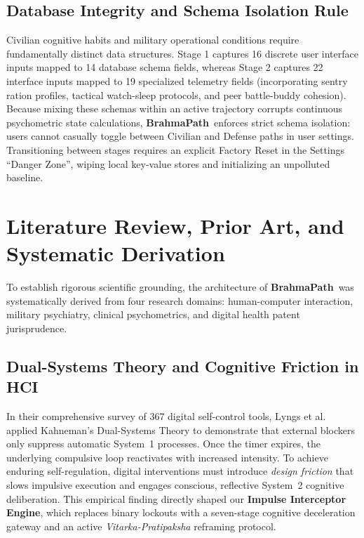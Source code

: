 \documentclass[11pt,a4paper]{article}
\newcommand{\AppName}{\textbf{BrahmaPath}}
\begin{document}
\subsection{Database Integrity and Schema Isolation Rule}
Civilian cognitive habits and military operational conditions require fundamentally distinct data structures. Stage 1 captures 16 discrete user interface inputs mapped to 14 database schema fields, whereas Stage 2 captures 22 interface inputs mapped to 19 specialized telemetry fields (incorporating sentry ration profiles, tactical watch-sleep protocols, and peer battle-buddy cohesion). Because mixing these schemas within an active trajectory corrupts continuous psychometric state calculations, \AppName\ enforces strict schema isolation: users cannot casually toggle between Civilian and Defense paths in user settings. Transitioning between stages requires an explicit Factory Reset in the Settings ``Danger Zone'', wiping local key-value stores and initializing an unpolluted baseline.

\section{Literature Review, Prior Art, and Systematic Derivation}

To establish rigorous scientific grounding, the architecture of \AppName\ was systematically derived from four research domains: human-computer interaction, military psychiatry, clinical psychometrics, and digital health patent jurisprudence.

\subsection{Dual-Systems Theory and Cognitive Friction in HCI}
In their comprehensive survey of 367 digital self-control tools, Lyngs et al.~\cite{lyngs2019selfcontrol} applied Kahneman's Dual-Systems Theory to demonstrate that external blockers only suppress automatic System~1 processes. Once the timer expires, the underlying compulsive loop reactivates with increased intensity. To achieve enduring self-regulation, digital interventions must introduce \textit{design friction} that slows impulsive execution and engages conscious, reflective System~2 cognitive deliberation. This empirical finding directly shaped our \textbf{Impulse Interceptor Engine}, which replaces binary lockouts with a seven-stage cognitive deceleration gateway and an active \textit{Vitarka-Pratipaksha} reframing protocol.
\end{document}
